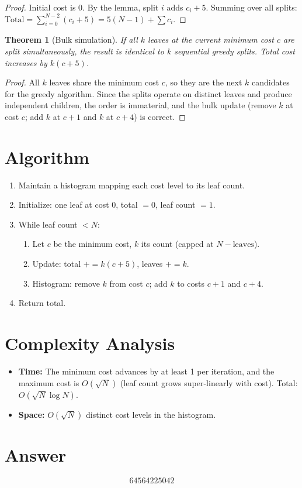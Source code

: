 \documentclass[12pt]{article}
\newtheorem{theorem}{Theorem}
\begin{document}
\begin{proof}
Initial cost is 0. By the lemma, split $i$ adds $c_i + 5$. Summing over all splits: $\mathrm{Total} = \sum_{i=0}^{N-2}(c_i+5) = 5(N{-}1) + \sum c_i$.
\end{proof}

\begin{theorem}[Bulk simulation]
If all $k$ leaves at the current minimum cost $c$ are split simultaneously, the result is identical to $k$ sequential greedy splits. Total cost increases by $k(c+5)$.
\end{theorem}

\begin{proof}
All $k$ leaves share the minimum cost $c$, so they are the next $k$ candidates for the greedy algorithm. Since the splits operate on distinct leaves and produce independent children, the order is immaterial, and the bulk update (remove $k$ at cost $c$; add $k$ at $c{+}1$ and $k$ at $c{+}4$) is correct.
\end{proof}

\section{Algorithm}

\begin{enumerate}
\item Maintain a histogram mapping each cost level to its leaf count.
\item Initialize: one leaf at cost 0, total $= 0$, leaf count $= 1$.
\item While leaf count $< N$:
  \begin{enumerate}
  \item Let $c$ be the minimum cost, $k$ its count (capped at $N - \text{leaves}$).
  \item Update: total $\mathrel{+}= k(c+5)$, leaves $\mathrel{+}= k$.
  \item Histogram: remove $k$ from cost $c$; add $k$ to costs $c{+}1$ and $c{+}4$.
  \end{enumerate}
\item Return total.
\end{enumerate}

\section{Complexity Analysis}

\begin{itemize}
\item \textbf{Time:} The minimum cost advances by at least 1 per iteration, and the maximum cost is $O(\sqrt{N})$ (leaf count grows super-linearly with cost). Total: $O(\sqrt{N}\log N)$.
\item \textbf{Space:} $O(\sqrt{N})$ distinct cost levels in the histogram.
\end{itemize}

\section{Answer}

\[
\boxed{64564225042}
\]
\end{document}

